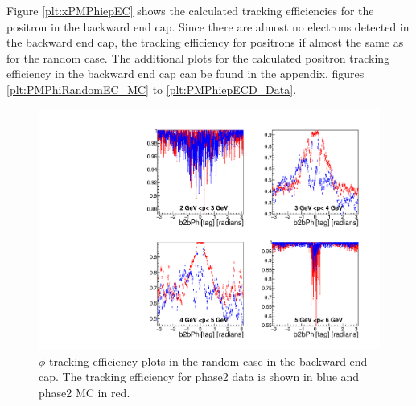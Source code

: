 \documentclass[a4paper,11pt,twosided,final,german,openbib,pdftex,listof=totoc,bibliography=totoc]{scrbook}
\begin{document}
Figure \ref{plt:xPMPhiepEC} shows the calculated tracking efficiencies for the positron in the backward end cap. Since there are almost no electrons detected in the backward end cap, the tracking efficiency for positrons if almost the same as for the random case. The additional plots for the calculated positron tracking efficiency in the backward end cap can be found in the appendix, figures \ref{plt:PMPhiRandomEC_MC} to \ref{plt:PMPhiepECD_Data}.



\begin{figure}[!htbp]
	\centering
	\includegraphics[width=\textwidth]{Plots/master/xPMPhiRandomEC}
	\caption[Momentum $\phi$ Random Backward End Cap Efficiency Phase2]{$\phi$ tracking efficiency plots in the random case in the backward end cap. The tracking efficiency for phase2 data is shown in blue and phase2 MC in red.}
	\label{plt:xPMPhiRandomEC}
\end{figure}
\end{document}
